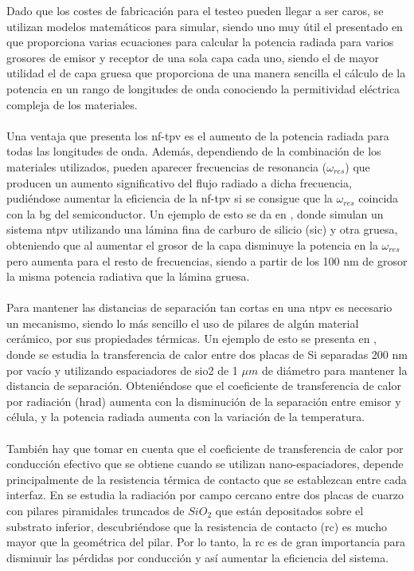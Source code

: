 Dado que los costes de fabricación para el testeo pueden llegar a ser caros, se utilizan modelos matemáticos para simular, siendo uno muy útil el presentado en \cite{nfTPV_equations} que proporciona varias ecuaciones para calcular la potencia radiada para varios grosores de emisor y receptor de una sola capa cada uno, siendo el de mayor utilidad el de capa gruesa que proporciona de una manera sencilla el cálculo de la potencia en un rango de longitudes de onda conociendo la permitividad eléctrica compleja de los materiales.\\\\
Una ventaja que presenta los \acrshort{nf-tpv} es el aumento de la potencia radiada para todas las longitudes de onda. Además, dependiendo de la combinación de los materiales utilizados, pueden aparecer frecuencias de resonancia ($\omega_{res}$) que producen un aumento significativo del flujo radiado a dicha frecuencia, pudiéndose aumentar la eficiencia de la \acrshort{nf-tpv} si se consigue que la $\omega_{res}$ coincida con la \acrshort{bg} del semiconductor. Un ejemplo de esto se da en \cite{doi:Near_field_ThinFilm}, donde simulan un sistema \acrshort{ntpv} utilizando una lámina fina de carburo de silicio (\acrshort{sic}) y otra gruesa, obteniendo que al aumentar el grosor de la capa disminuye la potencia en la $\omega_{res}$ pero aumenta para el resto de frecuencias, siendo a partir de los 100 nm de grosor la misma potencia radiativa que la lámina gruesa.\\\\
Para mantener las distancias de separación tan cortas en una \acrshort{ntpv} es necesario un mecanismo, siendo lo más sencillo el uso de pilares de algún material cerámico, por sus propiedades térmicas. Un ejemplo de esto se presenta en \cite{NearField200}, donde se estudia la transferencia de calor entre dos placas de Si separadas 200 nm por vacío y utilizando espaciadores de \acrshort{sio2} de 1 $\mu m$ de diámetro para mantener la distancia de separación. Obteniéndose que el coeficiente de transferencia de calor por radiación (\acrshort{hrad}) aumenta con la disminución de la separación entre emisor y célula, y la potencia radiada aumenta con la variación de la temperatura.\\\\
También hay que tomar en cuenta que el coeficiente de transferencia de calor por conducción efectivo que se obtiene cuando se utilizan nano-espaciadores, depende principalmente de la resistencia térmica de contacto que se establezcan entre cada interfaz. En \cite{nf_TPV_Pillars_SiO2} se estudia la radiación por campo cercano entre dos placas de cuarzo con pilares piramidales truncados de $SiO_2$ que están depositados sobre el substrato inferior, descubriéndose que la resistencia de contacto (\acrshort{rc}) es mucho mayor que la geométrica del pilar. Por lo tanto, la \acrshort{rc} es de gran importancia para disminuir las pérdidas por conducción y así aumentar la eficiencia del sistema.
